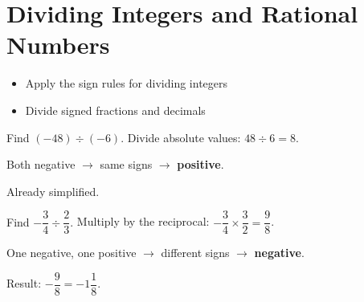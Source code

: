 \section{Dividing Integers and Rational Numbers}

\begin{stepGoal}
\begin{itemize}
    \item Apply the sign rules for dividing integers
    \item Divide signed fractions and decimals
\end{itemize}
\end{stepGoal}

\begin{stepVocabBox}
\end{stepVocabBox}

\begin{stepsCard}
\end{stepsCard}

\begin{stepExample}{Find $(-48) \div (-6)$.}
     Divide absolute values: $48 \div 6 = 8$.

     Both negative $\to$ same signs $\to$ \textbf{positive}.

     Already simplified.
\end{stepExample}

\begin{stepExample}{Find $-\dfrac{3}{4} \div \dfrac{2}{3}$.}
     Multiply by the reciprocal: $-\dfrac{3}{4} \times \dfrac{3}{2} = \dfrac{9}{8}$.

     One negative, one positive $\to$ different signs $\to$ \textbf{negative}.

     Result: $-\dfrac{9}{8} = -1\dfrac{1}{8}$.
\end{stepExample}

